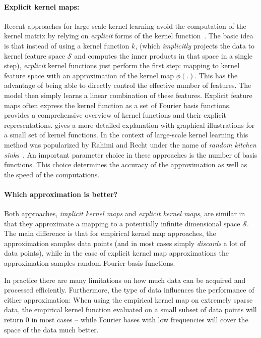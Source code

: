\documentclass{article} %
\begin{document}
\paragraph{Explicit kernel maps:} Recent approaches for large scale kernel learning avoid the computation of the kernel matrix by relying on {\em explicit} forms of the kernel function~\cite{Rahimi2008,Vedaldi2010}. The basic idea is that instead of using a kernel function $k$, (which {\em implicitly} projects the data to kernel feature space $\mathcal{S}$ and computes the inner products in that space in a single step), {\em explicit} kernel functions just perform the first step: mapping to kernel feature space with an approximation of the kernel map $\phi(.)$. This has the advantage of being able to directly control the effective number of features. The model then simply learns a linear combination of these features. Explicit feature maps often express the kernel function as a set of Fourier basis functions. \cite{Dai2014} provides a comprehensive overview of kernel functions and their explicit representations. \cite{Vedaldi2010} gives a more detailed explanation with graphical illustrations for a small set of kernel functions. In the context of large-scale kernel learning this method was popularized by Rahimi and Recht under the name of {\em random kitchen sinks}~\cite{Rahimi2008}. An important parameter choice in these approaches is the number of basis functions. This choice determines the accuracy of the approximation as well as the speed of the computations. 

\paragraph{Which approximation is better?}
Both approaches, {\em implicit kernel maps} and {\em explicit kernel maps}, are similar in that they approximate a mapping to a potentially infinite dimensional space $\mathcal{S}$. The main difference is that for empirical kernel map approaches, the approximation samples data points (and in most cases simply {\em discards} a lot of data points), while in the case of explicit kernel map approximations the approximation samples random Fourier basis functions. 

In practice there are many limitations on how much data can be acquired and processed efficiently. Furthermore, the type of data influences the performance of either approximation: When using the empirical kernel map on extremely sparse data, the empirical kernel function evaluated on a small subset of data points will return 0 in most cases -- while Fourier bases with low frequencies will cover the space of the data much better. 
\end{document}

